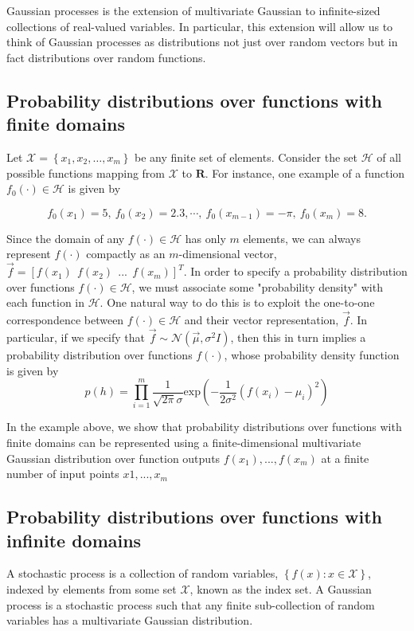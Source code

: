\documentclass{article}
\begin{document}
Gaussian processes is the extension of multivariate Gaussian to infinite-sized collections of real-valued variables. In particular, this extension will allow us to think of Gaussian processes as distributions not just over random vectors but in fact distributions over random functions.

\subsection{Probability distributions over functions with finite domains}
Let $\mathcal{X} = \left \{ x_1, x_2, …, x_m \right \}$ be any finite set of elements. Consider the set $\mathcal{H}$ of all possible functions mapping from $\mathcal{X}$ to $\mathbf{R}$. For instance, one example of a function $f_0(\cdot) \in \mathcal{H}$ is given by

$$f_0(x_1)=5,~f_0(x_2)=2.3, \dotsb ,~f_0(x_{m-1})=-\pi,~f_0(x_m)=8.$$

Since the domain of any $f(\cdot) \in \mathcal{H}$ has only $m$ elements, we can always represent $f(\cdot)$ compactly as an $m$-dimensional vector, $\vec{f}=[f(x_1)~~f(x_2)~~...~~f(x_m) ]^T$. In order to specify a probability distribution over functions $f(\cdot) \in \mathcal{H}$, we must associate some "probability density" with each function in $\mathcal{H}$. One natural way to do this is to exploit the one-to-one correspondence between $f(\cdot) \in \mathcal{H}$ and their vector representation, $\vec{f}$. In particular, if we specify that $\vec{f}\sim \mathcal{N}(\vec{\mu},\sigma ^2I)$, then this in turn implies a probability distribution over functions $f(\cdot)$, whose probability density function is given by
$$p(h) = \prod_{i=1}^{m} \frac{1}{\sqrt{2\pi}\sigma}\mathrm{exp}(-\frac{1}{2\sigma ^2} (f(x_i)-\mu _i)^2)
$$

In the example above, we show that probability distributions over functions with finite domains can be represented using a finite-dimensional multivariate Gaussian distribution over function outputs $f(x_1),...,f(x_m)$ at a finite number of input points $x1, ..., x_m$

\subsection{Probability distributions over functions with infinite domains}
A stochastic process is a collection of random variables, $\left \{ f(x): x \in \mathcal{X} \right \}$, indexed by elements from some set $\mathcal{X}$, known as the index set. A Gaussian process is a stochastic process such that any finite sub-collection of random variables has a multivariate Gaussian distribution.
\end{document}
